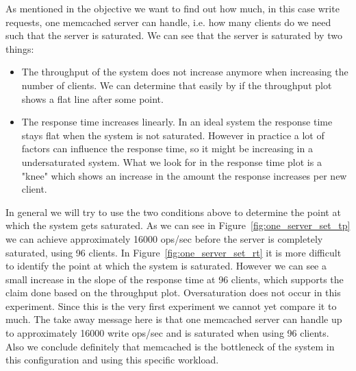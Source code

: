 \documentclass[11pt,a4paper]{article}
\begin{document}
%
As mentioned in the objective we want to find out how much, in this case write requests, one memcached server can handle, i.e. how many clients do we need such that the server is saturated.
%
We can see that the server is saturated by two things:
%
\begin{itemize}
	\item The throughput of the system does not increase anymore when increasing the number of clients. We can determine that easily by if the throughput plot shows a flat line after some point.
	\item The response time increases linearly. In an ideal system the response time stays flat when the system is not saturated. However in practice a lot of factors can influence the response time, so it might be increasing in a undersaturated system. What we look for in the response time plot is a "knee" which shows an increase in the amount the response increases per new client. 
\end{itemize}
%
In general we will try to use the two conditions above to determine the point at which the system gets saturated.
%
%
As we can see in Figure~\ref{fig:one_server_set_tp} we can achieve approximately 16000 ops/sec before the server is completely saturated, using 96 clients.
%
In Figure~\ref{fig:one_server_set_rt} it is more difficult to identify the point at which the system is saturated. 
%
However we can see a small increase in the slope of the response time at 96 clients, which supports the claim done based on the throughput plot.
%
Oversaturation does not occur in this experiment.
%
Since this is the very first experiment we cannot yet compare it to much.
%
The take away message here is that one memcached server can handle up to approximately 16000 write ops/sec and is saturated when using 96 clients.
%
Also we conclude definitely that memcached is the bottleneck of the system in this configuration and using this specific workload.
%
\end{document}
